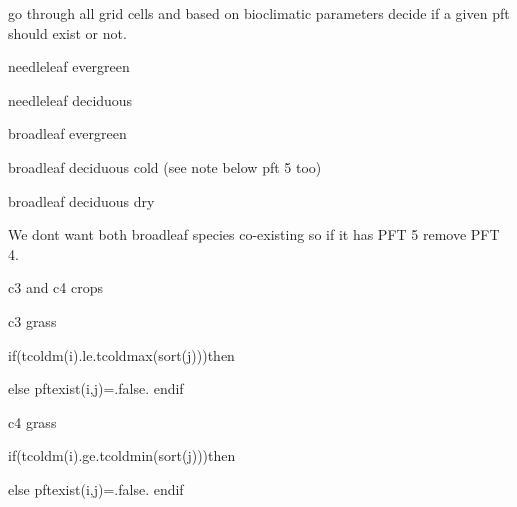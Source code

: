 go through all grid cells and based on bioclimatic parameters decide if a given pft should exist or not.

needleleaf evergreen

needleleaf deciduous

broadleaf evergreen

broadleaf deciduous cold (see note below pft 5 too)

broadleaf deciduous dry

We don\textquotesingle{}t want both broadleaf species co-\/existing so if it has P\+F\+T 5 remove P\+F\+T 4.

c3 and c4 crops

c3 grass

if(tcoldm(i).le.\+tcoldmax(sort(j)))then

else pftexist(i,j)=.false. endif

c4 grass

if(tcoldm(i).ge.\+tcoldmin(sort(j)))then

else pftexist(i,j)=.false. endif 